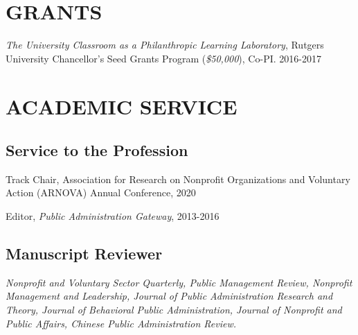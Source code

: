 \documentclass[letterpaper]{article}
\renewenvironment{itemize}{
  \begin{list}{}{
    \setlength{\leftmargin}{1.5em}
  }
}{
  \end{list}
}
\begin{document}
\bigskip


\section*{GRANTS}
\begin{itemize}
	
\item {\it The University Classroom as a Philanthropic Learning Laboratory}, Rutgers University Chancellor's Seed Grants Program ({\it \$50,000}), Co-PI. 2016-2017

\end{itemize}

\bigskip

\section*{ACADEMIC SERVICE}
\subsection*{Service to the Profession}
\begin{itemize}
	
\item Track Chair, Association for Research on Nonprofit Organizations and Voluntary Action (ARNOVA) Annual Conference, 2020

\item Editor, {\it Public Administration Gateway}, 2013-2016

\end{itemize}

\subsection*{Manuscript Reviewer}
\begin{itemize}
	
\item {\it Nonprofit and Voluntary Sector Quarterly, Public Management Review, Nonprofit Management and Leadership, Journal of Public Administration Research and Theory, Journal of Behavioral Public Administration, Journal of Nonprofit and Public Affairs, Chinese Public Administration Review.}

\end{itemize}

\bigskip
\end{document}
